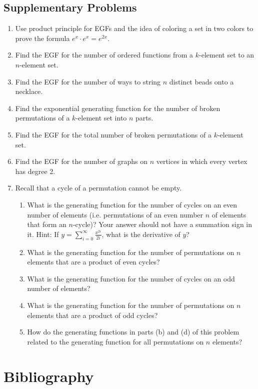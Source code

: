 \documentclass[10pt,]{book}
\theoremstyle{plain}
\theoremstyle{definition}
\numberwithin{equation}{chapter}
\begin{document}
\section[{Supplementary Problems}]{Supplementary Problems}\label{section-29}
\leavevmode%
\begin{enumerate}
\item\hypertarget{li-124}{}Use product principle for EGFs and the idea of coloring a set in two colors to prove the formula \(e^x\cdot e^x = e^{2x}.\)%
\item\hypertarget{li-125}{}Find the EGF for the number of ordered functions from a \(k\)-element set to an \(n\)-element set.%
\item\hypertarget{li-126}{}Find the EGF for the number of ways to string \(n\) distinct beads onto a necklace.%
\item\hypertarget{li-127}{}Find the exponential generating function for the number of broken permutations of a \(k\)-element set into \(n\) parts.%
\item\hypertarget{li-128}{}Find the EGF for the total number of broken permutations of a \(k\)-element set.%
\item\hypertarget{li-129}{}Find the EGF for the number of graphs on \(n\) vertices in which every vertex has degree 2.%
\item\hypertarget{li-130}{}Recall that a cycle of a permutation cannot be empty. %
\begin{enumerate}
\item\hypertarget{li-131}{}What is the generating function for the number of cycles on an even number of elements (i.e. permutations of an even number \(n\) of elements that form an \(n\)-cycle)?  Your answer should not have a summation sign in it.  Hint: If \(y=
\sum_{i=0}^\infty \frac{x^{2i}}{2i}\), what is the derivative of \(y\)?%
\item\hypertarget{li-132}{}What is the generating function for the number of permutations on \(n\) elements that are a product of even cycles?%
\item\hypertarget{li-133}{}What is the generating function for the number of cycles on an odd number of elements?%
\item\hypertarget{li-134}{}What is the generating function for the number of permutations on \(n\) elements that are a product of odd cycles?%
\item\hypertarget{li-135}{}How do the generating functions in parts (b) and (d) of this problem related to the generating function for all permutations on \(n\) elements?%
\end{enumerate}
%
\end{enumerate}
\typeout{************************************************}
\typeout{************************************************}
\chapter[{Bibliography}]{Bibliography}\label{references-1}
%
\renewcommand{\leftmark}{Index}
\printindex
%
\end{document}
